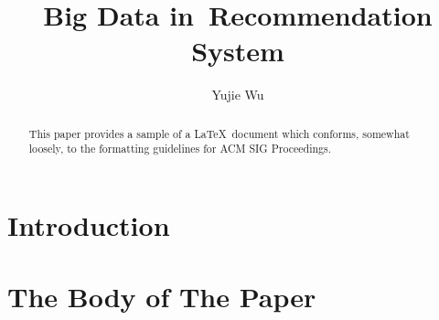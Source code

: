\documentclass[sigconf]{acmart}
\begin{document}
\title{Big Data in Recommendation System}


\author{Yujie Wu}


\renewcommand{\shortauthors}{Y. Wu}


\begin{abstract}
This paper provides a sample of a \LaTeX\ document which conforms,
somewhat loosely, to the formatting guidelines for
ACM SIG Proceedings.
\end{abstract}



\maketitle

\section{Introduction}

\cite{Abril07}

\section{The Body of The Paper}



 
\end{document}
